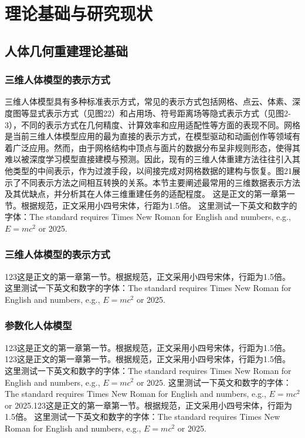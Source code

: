 \chapter{理论基础与研究现状}
\section{人体几何重建理论基础}
\vspace{0.3\baselineskip}
\subsection{三维人体模型的表示方式}
三维人体模型具有多种标准表示方式，常见的表示方式包括网格、点云、体素、深度图等显式表示方式（见图2­2）和占用场、符号距离场等隐式表示方式（见图2­3），不同的表示方式在几何精度、计算效率和应用适配性等方面的表现不同。网格是当前三维人体模型应用的最为直接的表示方式，在模型驱动和动画创作等领域有着广泛应用。然而，由于网格结构中顶点与面片的数据分布呈非规则形态，使得其难以被深度学习模型直接建模与预测。因此，现有的三维人体重建方法往往引入其他类型的中间表示，作为过渡手段，以间接完成对网格数据的建构与恢复。图2­1展示了不同表示方法之间相互转换的关系。本节主要阐述最常用的三维数据表示方法及其优缺点，并分析其在人体三维重建任务的适配程度。
这是正文的第一章第一节。根据规范，正文采用小四号宋体，行距为1.5倍。
这里测试一下英文和数字的字体：The standard requires Times New Roman for English and numbers, e.g., $E=mc^2$ or 2025.

\subsection{三维人体模型的表示方式}
123这是正文的第一章第一节。根据规范，正文采用小四号宋体，行距为1.5倍。
这里测试一下英文和数字的字体：The standard requires Times New Roman for English and numbers, e.g., $E=mc^2$ or 2025.

\subsection{参数化人体模型}
123这是正文的第一章第一节。根据规范，正文采用小四号宋体，行距为1.5倍。
123这是正文的第一章第一节。根据规范，正文采用小四号宋体，行距为1.5倍。
这里测试一下英文和数字的字体：The standard requires Times New Roman for English and numbers, e.g., $E=mc^2$ or 2025.
这里测试一下英文和数字的字体：The standard requires Times New Roman for English and numbers, e.g., $E=mc^2$ or 2025.123这是正文的第一章第一节。根据规范，正文采用小四号宋体，行距为1.5倍。
这里测试一下英文和数字的字体：The standard requires Times New Roman for English and numbers, e.g., $E=mc^2$ or 2025.
